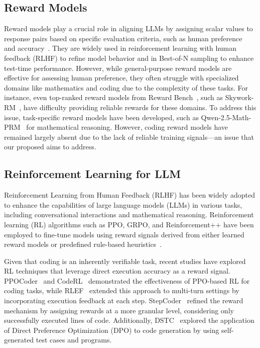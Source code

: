 \subsection{Reward Models}
\label{subsec:reward_models}
Reward models play a crucial role in aligning LLMs by assigning scalar values to response pairs based on specific evaluation criteria, such as human preference~\citep{instructgpt} and accuracy~\citep{Zhang2025TheLO}. They are widely used in reinforcement learning with human feedback (RLHF) to refine model behavior and in Best-of-N sampling to enhance test-time performance.
However, while general-purpose reward models are effective for assessing human preference, they often struggle with specialized domains like mathematics and coding due to the complexity of these tasks. For instance, even top-ranked reward models from Reward Bench~\citep{Lambert2024RewardBenchER}, such as Skywork-RM~\citep{skywork}, have difficulty providing reliable rewards for these domains. To address this issue, task-specific reward models have been developed, such as Qwen-2.5-Math-PRM~\citep{Zhang2025TheLO} for mathematical reasoning. However, coding reward models have remained largely absent due to the lack of reliable training signals—an issue that our proposed \RM{} aims to address.


\subsection{Reinforcement Learning for LLM}
\label{subsec:rl_for_llm}
Reinforcement Learning from Human Feedback (RLHF)\citep{instructgpt} has been widely adopted to enhance the capabilities of large language models (LLMs) in various tasks, including conversational interactions and mathematical reasoning\citep{yang2024qwen25mathtechnicalreportmathematical}. Reinforcement learning (RL) algorithms such as PPO\citep{Schulman2017ProximalPO}, GRPO\citep{Shao2024DeepSeekMathPT}, and Reinforcement++\citep{reinforce++} have been employed to fine-tune models using reward signals derived from either learned reward models\citep{Shao2024DeepSeekMathPT} or predefined rule-based heuristics~\citep{DeepseekR1, autocode}.

Given that coding is an inherently verifiable task, recent studies have explored RL techniques that leverage direct execution accuracy as a reward signal. PPOCoder~\citep{Shojaee2023ExecutionbasedCG} and CodeRL~\citep{Le2022CodeRLMC} demonstrated the effectiveness of PPO-based RL for coding tasks, while RLEF~\citep{Gehring2024RLEFGC} extended this approach to multi-turn settings by incorporating execution feedback at each step. StepCoder~\citep{Dou2024StepCoderIC} refined the reward mechanism by assigning rewards at a more granular level, considering only successfully executed lines of code. Additionally, DSTC~\citep{Liu2024DSTCDP} explored the application of Direct Preference Optimization (DPO) to code generation by using self-generated test cases and programs.

